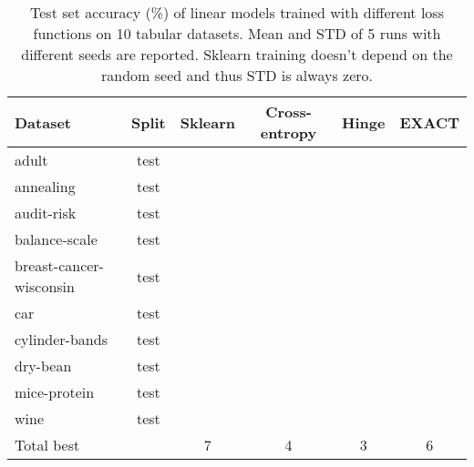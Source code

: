 \documentclass[nohyperref]{article}
\theoremstyle{plain}
\theoremstyle{definition}
\theoremstyle{remark}
\begin{document}
\begin{table*}[t]
\centering
\begin{tabular}{lc|cccc}
Dataset & Split & Sklearn & Cross-entropy & Hinge & EXACT \\
\hline

adult                   & test &  &  &  &  \\
annealing               & test &  &  &  &  \\
audit-risk              & test &  &  &  &  \\
balance-scale           & test &  &  &  &  \\
breast-cancer-wisconsin & test &  &  &  &  \\
car                     & test &  &  &  &  \\
cylinder-bands          & test &  &  &  &  \\
dry-bean                & test &  &  &  &  \\
mice-protein            & test &  &  &  &  \\
wine                    & test &  &  &  &  \\
\hline
Total best & & 7 & 4 & 3 & 6 \\




\end{tabular}
\vskip 0.2in
\caption{Test set accuracy (\%) of linear models trained with different loss functions on 10 tabular datasets. Mean and STD of 5 runs with different seeds are reported. Sklearn training doesn't depend on the random seed and thus STD is always zero.}
\label{tab:uci-test}
\end{table*}
\end{document}
